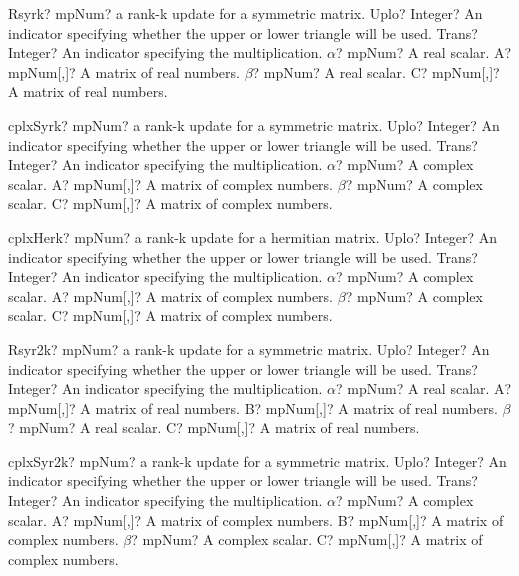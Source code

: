 \documentclass[12pt,a4paper,openany]{book}
\begin{document}
\begin{mpFunctionsExtract}
\mpFunctionSix
{Rsyrk? mpNum? a rank-k update for a symmetric matrix.}
{Uplo? Integer? An indicator specifying whether the upper or lower triangle will be used.}
{Trans? Integer? An indicator specifying the multiplication.}
{$\alpha$? mpNum? A real scalar.}
{A? mpNum[,]? A matrix of real numbers.}
{$\beta$? mpNum? A real scalar.}
{C? mpNum[,]? A matrix of real numbers.}
\end{mpFunctionsExtract}

\begin{mpFunctionsExtract}
\mpFunctionSix
{cplxSyrk? mpNum? a rank-k update for a symmetric matrix.}
{Uplo? Integer? An indicator specifying whether the upper or lower triangle will be used.}
{Trans? Integer? An indicator specifying the multiplication.}
{$\alpha$? mpNum? A complex scalar.}
{A? mpNum[,]? A matrix of complex numbers.}
{$\beta$? mpNum? A complex scalar.}
{C? mpNum[,]? A matrix of complex numbers.}
\end{mpFunctionsExtract}

\begin{mpFunctionsExtract}
\mpFunctionSix
{cplxHerk? mpNum? a rank-k update for a hermitian matrix.}
{Uplo? Integer? An indicator specifying whether the upper or lower triangle will be used.}
{Trans? Integer? An indicator specifying the multiplication.}
{$\alpha$? mpNum? A complex scalar.}
{A? mpNum[,]? A matrix of complex numbers.}
{$\beta$? mpNum? A complex scalar.}
{C? mpNum[,]? A matrix of complex numbers.}
\end{mpFunctionsExtract}

\begin{mpFunctionsExtract}
\mpFunctionSeven
{Rsyr2k? mpNum? a rank-k update for a symmetric matrix.}
{Uplo? Integer? An indicator specifying whether the upper or lower triangle will be used.}
{Trans? Integer? An indicator specifying the multiplication.}
{$\alpha$? mpNum? A real scalar.}
{A? mpNum[,]? A matrix of real numbers.}
{B? mpNum[,]? A matrix of real numbers.}
{$\beta$? mpNum? A real scalar.}
{C? mpNum[,]? A matrix of real numbers.}
\end{mpFunctionsExtract}

\begin{mpFunctionsExtract}
\mpFunctionSeven
{cplxSyr2k? mpNum? a rank-k update for a symmetric matrix.}
{Uplo? Integer? An indicator specifying whether the upper or lower triangle will be used.}
{Trans? Integer? An indicator specifying the multiplication.}
{$\alpha$? mpNum? A complex scalar.}
{A? mpNum[,]? A matrix of complex numbers.}
{B? mpNum[,]? A matrix of complex numbers.}
{$\beta$? mpNum? A complex scalar.}
{C? mpNum[,]? A matrix of complex numbers.}
\end{mpFunctionsExtract}
\end{document}
